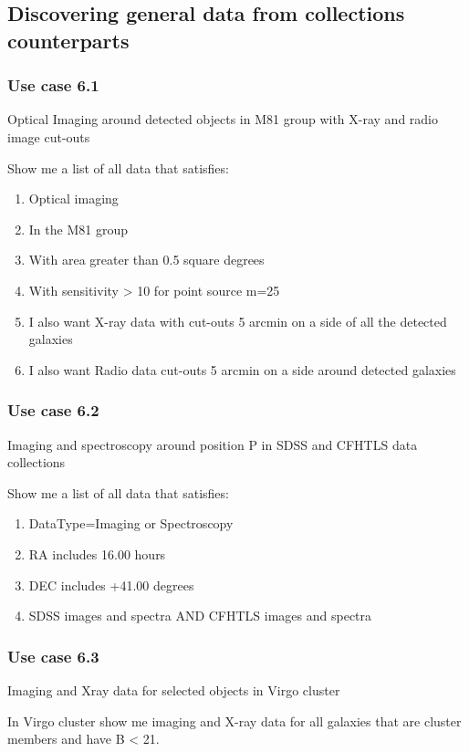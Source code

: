 \documentclass[11pt,a4paper]{ivoa}
\begin{document}
\subsection[Discovering general data from collections counterparts]{Discovering general data from collections
counterparts}
\subsubsection{Use case 6.1}
Optical Imaging around detected objects in M81 group with X-ray and radio image cut-outs

Show me a list of all data that satisfies:

\begin{enumerate}
\item Optical imaging
\item In the M81 group
\item With area greater than 0.5 square degrees
\item With sensitivity {\textgreater} 10 for point source m=25
\item I also want X-ray data with cut-outs 5 arcmin on a side of all the detected galaxies
\item I also want Radio data cut-outs 5 arcmin on a side around detected galaxies
\end{enumerate}
\subsubsection{Use case 6.2}
Imaging and spectroscopy around position P in SDSS and CFHTLS data collections

 Show me a list of all data that satisfies:

\begin{enumerate}
\item DataType=Imaging or Spectroscopy
\item RA includes 16.00 hours
\item DEC includes +41.00 degrees
\item SDSS images and spectra AND CFHTLS images and spectra
\end{enumerate}
\subsubsection{Use case 6.3}
Imaging and Xray data for selected objects in Virgo cluster

In Virgo cluster show me imaging and X-ray data for all galaxies that are cluster members and have B {\textless} 21.
\end{document}
